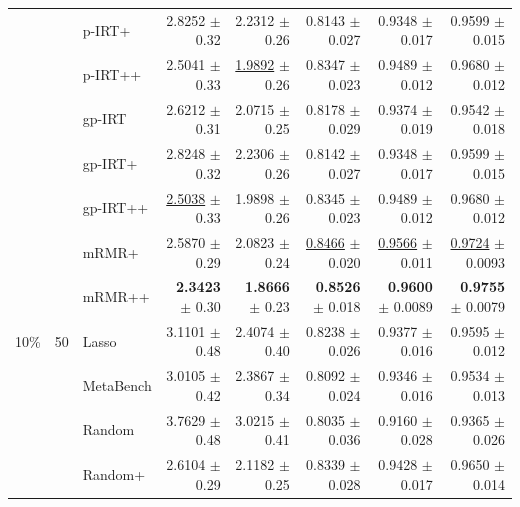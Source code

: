 \begin{longtable}{llp{}rrrrr}
 &  & p-IRT+ & 2.8252 {\scriptsize $\pm$ 0.32} & 2.2312 {\scriptsize $\pm$ 0.26} & 0.8143 {\scriptsize $\pm$ 0.027} & 0.9348 {\scriptsize $\pm$ 0.017} & 0.9599 {\scriptsize $\pm$ 0.015} \\
 &  & p-IRT++ & 2.5041 {\scriptsize $\pm$ 0.33} & \underline{1.9892} {\scriptsize $\pm$ 0.26} & 0.8347 {\scriptsize $\pm$ 0.023} & 0.9489 {\scriptsize $\pm$ 0.012} & 0.9680 {\scriptsize $\pm$ 0.012} \\
 &  & gp-IRT & 2.6212 {\scriptsize $\pm$ 0.31} & 2.0715 {\scriptsize $\pm$ 0.25} & 0.8178 {\scriptsize $\pm$ 0.029} & 0.9374 {\scriptsize $\pm$ 0.019} & 0.9542 {\scriptsize $\pm$ 0.018} \\
 &  & gp-IRT+ & 2.8248 {\scriptsize $\pm$ 0.32} & 2.2306 {\scriptsize $\pm$ 0.26} & 0.8142 {\scriptsize $\pm$ 0.027} & 0.9348 {\scriptsize $\pm$ 0.017} & 0.9599 {\scriptsize $\pm$ 0.015} \\
 &  & gp-IRT++ & \underline{2.5038} {\scriptsize $\pm$ 0.33} & 1.9898 {\scriptsize $\pm$ 0.26} & 0.8345 {\scriptsize $\pm$ 0.023} & 0.9489 {\scriptsize $\pm$ 0.012} & 0.9680 {\scriptsize $\pm$ 0.012} \\
 &  & mRMR+ & 2.5870 {\scriptsize $\pm$ 0.29} & 2.0823 {\scriptsize $\pm$ 0.24} & \underline{0.8466} {\scriptsize $\pm$ 0.020} & \underline{0.9566} {\scriptsize $\pm$ 0.011} & \underline{0.9724} {\scriptsize $\pm$ 0.0093} \\
 &  & mRMR++ & \textbf{2.3423} {\scriptsize $\pm$ 0.30} & \textbf{1.8666} {\scriptsize $\pm$ 0.23} & \textbf{0.8526} {\scriptsize $\pm$ 0.018} & \textbf{0.9600} {\scriptsize $\pm$ 0.0089} & \textbf{0.9755} {\scriptsize $\pm$ 0.0079} \\
\midrule
10\% & 50 & Lasso & 3.1101 {\scriptsize $\pm$ 0.48} & 2.4074 {\scriptsize $\pm$ 0.40} & 0.8238 {\scriptsize $\pm$ 0.026} & 0.9377 {\scriptsize $\pm$ 0.016} & 0.9595 {\scriptsize $\pm$ 0.012} \\
 &  & MetaBench & 3.0105 {\scriptsize $\pm$ 0.42} & 2.3867 {\scriptsize $\pm$ 0.34} & 0.8092 {\scriptsize $\pm$ 0.024} & 0.9346 {\scriptsize $\pm$ 0.016} & 0.9534 {\scriptsize $\pm$ 0.013} \\
 &  & Random & 3.7629 {\scriptsize $\pm$ 0.48} & 3.0215 {\scriptsize $\pm$ 0.41} & 0.8035 {\scriptsize $\pm$ 0.036} & 0.9160 {\scriptsize $\pm$ 0.028} & 0.9365 {\scriptsize $\pm$ 0.026} \\
 &  & Random+ & 2.6104 {\scriptsize $\pm$ 0.29} & 2.1182 {\scriptsize $\pm$ 0.25} & 0.8339 {\scriptsize $\pm$ 0.028} & 0.9428 {\scriptsize $\pm$ 0.017} & 0.9650 {\scriptsize $\pm$ 0.014} \\

\end{longtable}
